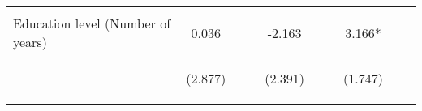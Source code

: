 \begin{center}
\begin{tabular}{lccccccccc}
\vspace{4pt} & \begin{footnotesize}[0.036]\end{footnotesize} & \begin{footnotesize}\end{footnotesize} & \begin{footnotesize}\end{footnotesize} & \begin{footnotesize}[0.147]\end{footnotesize} & \begin{footnotesize}\end{footnotesize} & \begin{footnotesize}\end{footnotesize} & \begin{footnotesize}[0.674]\end{footnotesize} & \begin{footnotesize}\end{footnotesize} & \begin{footnotesize}\end{footnotesize} \\
Education level (Number of years) & 0.036 &  &  & -2.163 &  &  & 3.166* &  &  \\
 & \begin{footnotesize}(2.877)\end{footnotesize} & \begin{footnotesize}\end{footnotesize} & \begin{footnotesize}\end{footnotesize} & \begin{footnotesize}(2.391)\end{footnotesize} & \begin{footnotesize}\end{footnotesize} & \begin{footnotesize}\end{footnotesize} & \begin{footnotesize}(1.747)\end{footnotesize} & \begin{footnotesize}\end{footnotesize} & \begin{footnotesize}\end{footnotesize} \\

\end{tabular}
\end{center}
